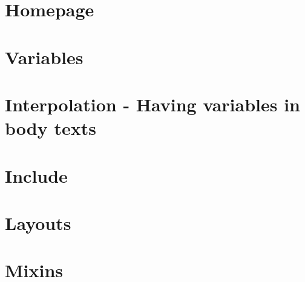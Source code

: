 \section{Homepage}

\section{Variables}

\section{Interpolation - Having variables in body texts}

\section{Include}

\section{Layouts}

\section{Mixins}